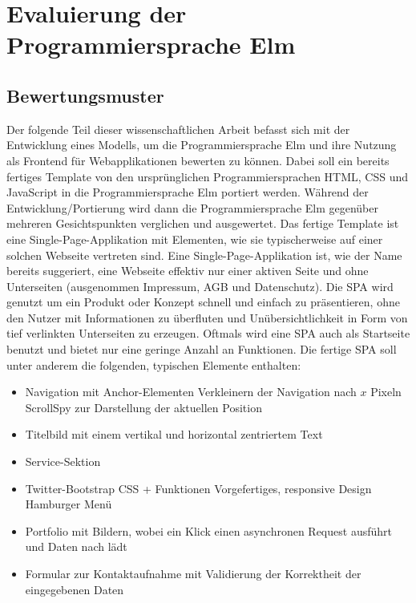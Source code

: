 \chapter{Evaluierung der Programmiersprache Elm}
\label{sec:Evaluierung der Programmiersprache Elm}
\pagestyle{plain}

\section{Bewertungsmuster}
\label{sec:Bewertungsmuster}
Der folgende Teil dieser wissenschaftlichen Arbeit befasst sich mit der Entwicklung eines Modells, um die Programmiersprache Elm und ihre Nutzung als Frontend für Webapplikationen bewerten zu können. Dabei soll ein bereits fertiges Template von den ursprünglichen Programmiersprachen HTML, CSS und JavaScript in die Programmiersprache Elm portiert werden. Während der Entwicklung/Portierung wird dann die Programmiersprache Elm gegenüber mehreren Gesichtspunkten verglichen und ausgewertet.
Das fertige Template ist eine Single-Page-Applikation mit Elementen, wie sie typischerweise auf einer solchen Webseite vertreten sind. Eine Single-Page-Applikation ist, wie der Name bereits suggeriert, eine Webseite effektiv nur einer aktiven Seite und ohne Unterseiten (ausgenommen Impressum, AGB und Datenschutz). Die SPA wird genutzt um ein Produkt oder Konzept schnell und einfach zu präsentieren, ohne den Nutzer mit Informationen zu überfluten und Unübersichtlichkeit in Form von tief verlinkten Unterseiten zu erzeugen. Oftmals wird eine SPA auch als Startseite benutzt und bietet nur eine geringe Anzahl an Funktionen.
Die fertige SPA soll unter anderem die folgenden, typischen Elemente enthalten:
\begin{itemize}
\item Navigation mit Anchor-Elementen
\subitem{-} Verkleinern der Navigation nach $x$ Pixeln
\subitem{-} ScrollSpy zur Darstellung der aktuellen Position
\item Titelbild mit einem vertikal und horizontal zentriertem Text
\item Service-Sektion
\item Twitter-Bootstrap CSS + Funktionen
\subitem{-} Vorgefertiges, responsive Design
\subitem{-} Hamburger Menü
\item Portfolio mit Bildern, wobei ein Klick einen asynchronen Request ausführt und Daten nach lädt
\item Formular zur Kontaktaufnahme mit Validierung der Korrektheit der eingegebenen Daten
\end{itemize}
